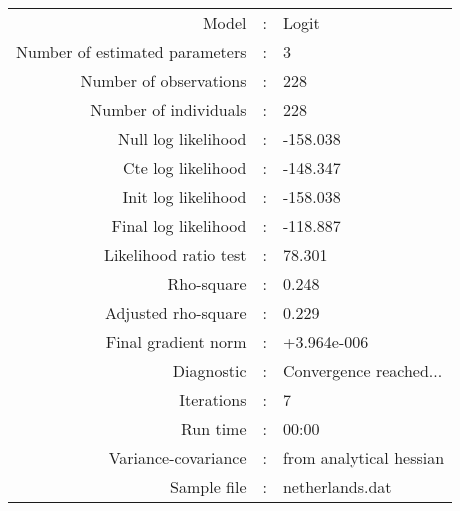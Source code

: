 

\begin{flushleft}
\begin{tabular}{rcl}
\hline
Model &:& Logit\\
Number of estimated parameters&:&3\\
Number of  observations &:& 228\\
Number of individuals&:&228\\
Null log likelihood&:&-158.038\\
Cte log likelihood&:&-148.347\\
Init log likelihood&:&-158.038\\
Final log likelihood&:&-118.887\\
Likelihood ratio test &:&78.301\\
Rho-square&:&0.248\\
Adjusted rho-square&:&0.229\\
Final gradient norm&:&+3.964e-006\\
Diagnostic&:&Convergence reached...\\
Iterations&:&7\\
Run time&:&00:00\\
Variance-covariance&:&from analytical hessian
\\
Sample file&:&netherlands.dat\\
\end{tabular}
\end{flushleft}
